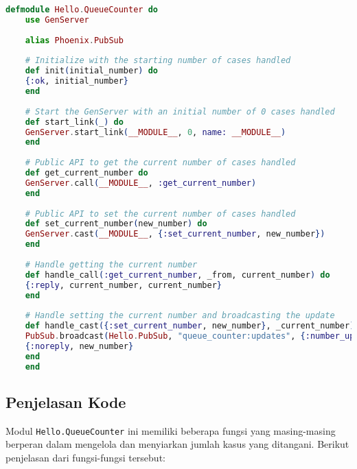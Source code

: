 \begin{lstlisting}[language=Elixir]
	defmodule Hello.QueueCounter do
	use GenServer
	
	alias Phoenix.PubSub
	
	# Initialize with the starting number of cases handled
	def init(initial_number) do
	{:ok, initial_number}
	end
	
	# Start the GenServer with an initial number of 0 cases handled
	def start_link(_) do
	GenServer.start_link(__MODULE__, 0, name: __MODULE__)
	end
	
	# Public API to get the current number of cases handled
	def get_current_number do
	GenServer.call(__MODULE__, :get_current_number)
	end
	
	# Public API to set the current number of cases handled
	def set_current_number(new_number) do
	GenServer.cast(__MODULE__, {:set_current_number, new_number})
	end
	
	# Handle getting the current number
	def handle_call(:get_current_number, _from, current_number) do
	{:reply, current_number, current_number}
	end
	
	# Handle setting the current number and broadcasting the update
	def handle_cast({:set_current_number, new_number}, _current_number) do
	PubSub.broadcast(Hello.PubSub, "queue_counter:updates", {:number_update, new_number})
	{:noreply, new_number}
	end
	end
\end{lstlisting}

\subsection{Penjelasan Kode}
Modul \texttt{Hello.QueueCounter} ini memiliki beberapa fungsi yang masing-masing berperan dalam mengelola dan menyiarkan jumlah kasus yang ditangani. Berikut penjelasan dari fungsi-fungsi tersebut:

